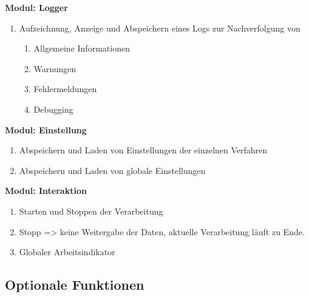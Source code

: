 \textbf{Modul: Logger}
\begin{enumerate}[ align=left, label={\textbf{\textbackslash FM4\arabic*0\textbackslash}} ]
	\item Aufzeichnung, Anzeige und Abspeichern eines Logs zur Nachverfolgung von
	\begin{enumerate}[ align=left, label={\textbf{\arabic*}} ]
		\item Allgemeine Informationen
		\item Warnungen
		\item Fehlermeldungen
		\item Debugging
	\end{enumerate}
\end{enumerate}
\textbf{Modul: Einstellung}
\begin{enumerate}[ align=left, label={\textbf{\textbackslash FM5\arabic*0\textbackslash}} ]
	\item Abspeichern und Laden von Einstellungen der einzelnen Verfahren
	\item Abspeichern und Laden von globale Einstellungen
\end{enumerate}
\textbf{Modul: Interaktion}
\begin{enumerate}[ align=left, label={\textbf{\textbackslash FM6\arabic*0\textbackslash}} ]
	\item Starten und Stoppen der Verarbeitung
	\item Stopp => keine Weitergabe der Daten, aktuelle Verarbeitung läuft zu Ende.
	\item Globaler Arbeitsindikator
\end{enumerate}	

\subsection{Optionale Funktionen}

